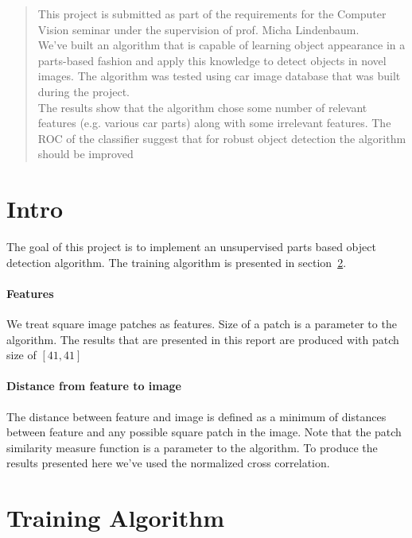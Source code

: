 \documentclass[12pt]{article}
\begin{document}
\maketitle

\begin{abstract}

This project is submitted as part of the requirements for the Computer Vision seminar under the supervision of prof. Micha Lindenbaum. \\ We've built an algorithm that is capable of learning object appearance in a parts-based fashion and apply this knowledge to detect objects in novel images.  The algorithm was tested using car image database that was built during the project.
\\ The results show that the algorithm chose some number of relevant features (e.g. various car parts) along with some irrelevant features.  The ROC of the classifier suggest that for robust object detection the algorithm should be improved

\end{abstract}

\section{Intro}
The goal of this project is to implement an unsupervised parts based object detection algorithm.  The training algorithm is presented in section~\ref{training}.
\paragraph{Features} We treat square image patches as features.  Size of a patch is a parameter to the algorithm.  The results that are presented in this report are produced with patch size of $[41,41]$
\paragraph{Distance from feature to image} The distance between feature and image is defined as a minimum of distances between feature and any possible square patch in the image.  Note that the patch similarity measure function is a parameter to the algorithm.  To produce the results presented here we've used the normalized cross correlation.


\section{Training Algorithm}\label{training}
\end{document}
